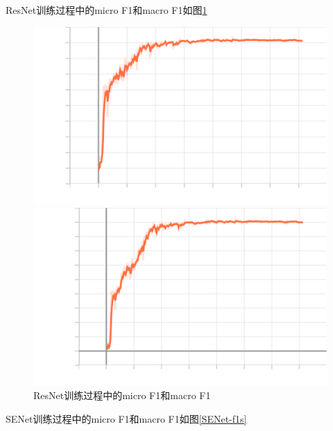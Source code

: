 \documentclass{article}
\begin{document}
ResNet训练过程中的micro F1和macro F1如图\ref{ResNet-f1s}

\begin{figure}[H]
    \begin{minipage}[H]{0.5\linewidth}
        \centering
        \includegraphics[width=\textwidth]{figures/resnet_noaug_microf1score_dev.png}
    \end{minipage}
    \begin{minipage}[H]{0.5\linewidth}
        \centering
        \includegraphics[width=\textwidth]{figures/resnet_noaug_macrof1score_dev.png}
    \end{minipage}
    \caption{ResNet训练过程中的micro F1和macro F1}
    \label{ResNet-f1s}
\end{figure}

SENet训练过程中的micro F1和macro F1如图\ref{SENet-f1s}
\end{document}
